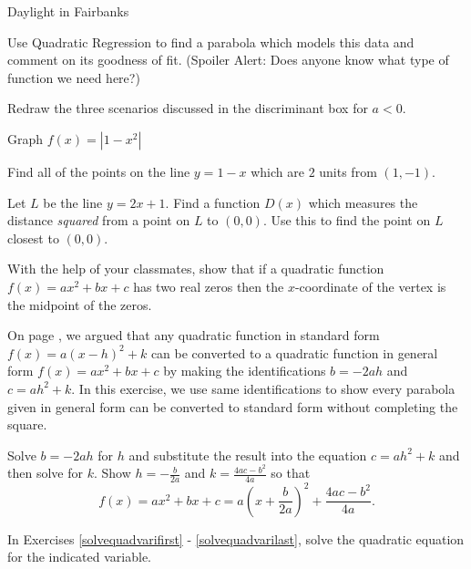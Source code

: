 \begin{exenum}
\begin{enumerate}
\begin{table}
\begin{center}
\caption{Daylight in Fairbanks}
\label{tab:daylightinfaribanks}
\end{center}
\end{table}

\noindent Use Quadratic Regression to find a parabola which models this data and comment on its goodness of fit. (Spoiler Alert: Does anyone know what type of function we need here?)

\end{enumerate}


\item Redraw the three scenarios discussed in the discriminant box for $a<0$.  \label{redrawthezeroscenarios}

\item Graph $f(x) = |1 - x^{2}|$

\item  Find all of the points on the line $y=1-x$ which are $2$ units from $(1,-1)$.

\item  Let $L$ be the line $y = 2x+1$.  Find a function $D(x)$ which measures the distance \textit{squared} from a point on $L$ to $(0,0)$.  Use this to find the point on $L$ closest to $(0,0)$.

\item With the help of your classmates, show that if a quadratic function $f(x) = ax^{2} + bx + c$ has two real zeros then the $x$-coordinate of the vertex is the midpoint of the zeros.

\item  \label{avoidcompsquare}  On page \pageref{standardtogeneraldiscussion}, we argued that any quadratic function in standard form $f(x) = a(x-h)^2+k$ can be converted to a quadratic function in general form $f(x) = ax^2+bx+c$ by making the identifications $b=-2ah$ and $c = ah^2+k$.  In this exercise, we use same identifications to show every parabola given in general form can be converted to standard form without completing the square.

Solve $b=-2ah$ for $h$ and substitute the result into the equation $c = ah^2+k$ and then solve for $k$.  Show  $h = -\frac{b}{2a}$ and $k = \frac{4ac-b^2}{4a}$ so that \[ f(x) = ax^2+bx+c = a\left(x + \dfrac{b}{2a}\right)^2  + \dfrac{4ac - b^2}{4a}. \]

\end{exenum}

In Exercises \ref{solvequadvarifirst} - \ref{solvequadvarilast}, solve the quadratic equation for the indicated variable.

